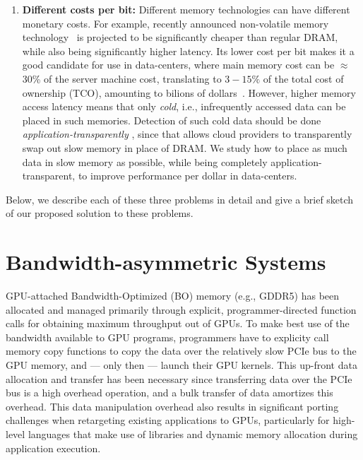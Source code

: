 \begin{enumerate}
\item
\textbf{Different costs per bit:}
Different memory technologies can have different monetary costs.  For example,
recently announced non-volatile memory technology~\cite{xpoint} is projected to
be significantly cheaper than regular DRAM, while also being significantly
higher latency. Its lower cost per bit makes it a good candidate for use in
data-centers, where main memory cost can be $\approx$ 30\% of the server machine
cost, translating to $3-15\%$ of the total cost of ownership (TCO), amounting to
bilions of dollars~\cite{borosso2013}. However, higher memory access latency means that only
{\it cold}, i.e., infrequently accessed data can be placed in such memories.
Detection of such cold data should be done {\it
application-transparently} , since
that allows cloud providers to transparently swap out slow memory in place of
DRAM.
We study how to place as much data in slow memory as possible, while being
completely application-transparent, to improve
performance per dollar in data-centers.  \end{enumerate}

Below, we describe each of these three problems in detail and give a brief
sketch of our proposed solution to these problems.

\section{Bandwidth-asymmetric Systems}
GPU-attached Bandwidth-Optimized (BO) memory (e.g., GDDR5) has been allocated
and managed primarily through explicit, programmer-directed function calls for
obtaining maximum throughput out of GPUs.  To make best use of the bandwidth
available to GPU programs, programmers have to explicity call memory copy
functions to copy the data over the relatively slow PCIe bus to the GPU memory,
and --- only then --- launch their GPU kernels.  This up-front data allocation
and transfer has been necessary since transferring data over the PCIe bus is a
high overhead operation, and a bulk transfer of data amortizes this overhead.
This data manipulation overhead also results in significant porting challenges
when retargeting existing applications to GPUs, particularly for high-level
languages that make use of libraries and dynamic memory allocation during
application execution.

